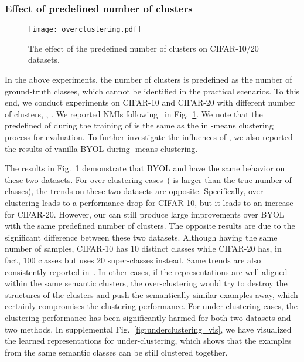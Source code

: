 \subsubsection{Effect of predefined number of clusters}
\begin{figure}[t]
  \centering
  \texttt{[image: overclustering.pdf]}
  \caption{
    The effect of the predefined number of clusters  on CIFAR-10/20 datasets.
  }
  \label{fig:overclustering}
\end{figure}

In the above experiments, the number of clusters is predefined as the number of ground-truth classes, which cannot be identified in the practical scenarios.
To this end, we conduct experiments on CIFAR-10 and CIFAR-20 with different number of clusters, \ie, . We reported NMIs following~\cite{caron2018deep} in Fig.~\ref{fig:overclustering}. We note that the predefined  of \methodname during the training of \methodname is the same as the  in -means clustering process for evaluation. To further investigate the influences of , we also reported the results of vanilla BYOL during -means clustering.

The results in Fig.~\ref{fig:overclustering} demonstrate that BYOL and \methodname have the same behavior on these two datasets.
For over-clustering cases~( is larger than the true number of classes), the trends on these two datasets are opposite.
Specifically, over-clustering leads to a performance drop for CIFAR-10, but it leads to an increase for CIFAR-20. However, our \methodname can still produce large improvements over BYOL with the same predefined number of clusters.
The opposite results are due to the significant difference between these two datasets. Although having the same number of samples, CIFAR-10 has 10 distinct classes while CIFAR-20 has, in fact, 100 classes but uses 20 super-classes instead. Same trends are also consistently reported in~\cite{caron2018deep}.
In other cases, if the representations are well aligned within the same semantic clusters, the over-clustering would try to destroy the structures of the clusters and push the semantically similar examples away, which certainly compromises the clustering performance.
For under-clustering cases, the clustering performance has been significantly harmed for both two datasets and two methods. In supplemental Fig.~\ref{fig:underclustering_vis}, we have visualized the learned representations for under-clustering, which shows that the examples from the same semantic classes can be still clustered together.

